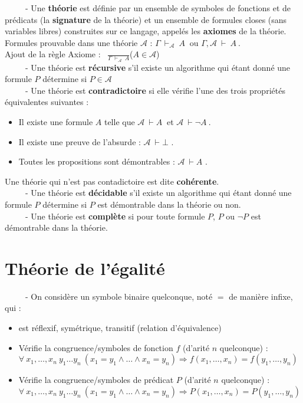 \documentclass[11pt,a4paper]{article}
\begin{document}
\ \ \ \ \ - Une \textbf{théorie} est définie par un ensemble de symboles de fonctions et de prédicats (la \textbf{signature} de la théorie) et un ensemble de formules closes (sans variables libres) construites sur ce langage, appelés les \textbf{axiomes} de la théorie. Formules prouvable dans une théorie $\mathcal{A}$ : $\Gamma \ \vdash_\mathcal{A} \ A \ $ ou $\Gamma,\mathcal{A} \ \vdash \ A \ $. \\
Ajout de la règle Axiome : \ {\Large $\frac{}{\Gamma \ \vdash_\mathcal{A} \ A}$}($A \in \mathcal{A}$) \\

\ \ \ \ \ - Une théorie est \textbf{récursive} s'il existe un algorithme qui étant donné une formule $P$ détermine si $P \in \mathcal{A}$ \\

\ \ \ \ \ - Une théorie est \textbf{contradictoire} si elle vérifie l'une des trois propriétés équivalentes suivantes : 
\begin{itemize}
\item Il existe une formule $A$ telle que $\mathcal{A} \ \vdash A \ $ et $\mathcal{A} \ \vdash \lnot A \ $.
\item Il existe une preuve de l'absurde : $\mathcal{A} \ \vdash \bot$ .
\item Toutes les propositions sont démontrables : $\mathcal{A} \ \vdash A$ .
\end{itemize}
Une théorie qui n'est pas contadictoire est dite \textbf{cohérente}. \\

\ \ \ \ \ - Une théorie est \textbf{décidable} s'il existe un algorithme qui étant donné une formule $P$ détermine si $P$ est démontrable dans la théorie ou non. \\

\ \ \ \ \ - Une théorie est \textbf{complète} si pour toute formule $P$, $P$ ou $\lnot P$ est démontrable dans la théorie.

\section{Théorie de l'égalité}

\ \ \ \ \ - On considère un symbole binaire quelconque, noté $=$ de manière infixe, qui :
\begin{itemize}
\item  est réflexif, symétrique, transitif (relation d'équivalence)
\item Vérifie la congruence/symboles de fonction $f$ (d'arité $n$ quelconque) : \\
$ \forall \ x_1, \dots , x_n \ y_1 \dots y_n \ (x_1=y_1 \land \dots \land x_n = y_n) \Rightarrow f(x_1, \dots , x_n) = f(y_1, \dots , y_n)  $
\item Vérifie la congruence/symboles de prédicat $P$ (d'arité $n$ quelconque) : \\
$ \forall \ x_1, \dots , x_n \ y_1 \dots y_n \ (x_1=y_1 \land \dots \land x_n = y_n) \Rightarrow P(x_1, \dots , x_n) = P(y_1, \dots , y_n)  $
\end{itemize}
\end{document}

